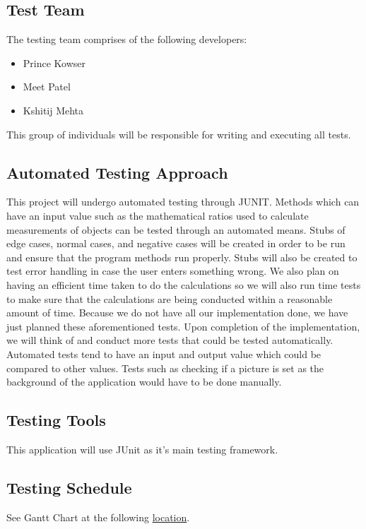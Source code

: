 \documentclass[12pt, titlepage]{article}
\begin{document}
\subsection{Test Team}
The testing team comprises of the following developers:
\begin{itemize}
    \item Prince Kowser
    \item Meet Patel
    \item Kshitij Mehta
\end{itemize}

This group of individuals will be responsible for writing and executing all tests.

\subsection{Automated Testing Approach}

This project will undergo automated testing through JUNIT. Methods which can have an input value such as the mathematical ratios used to calculate measurements of objects can be tested through an automated means. Stubs of edge cases, normal cases, and negative cases will be created in order to be run and ensure that the program methods run properly. Stubs will also be created to test error handling in case the user enters something wrong. We also plan on having an efficient time taken to do the calculations so we will also run time tests to make sure that the calculations are being conducted within a reasonable amount of time. Because we do not have all our implementation done, we have just planned these aforementioned tests. Upon completion of the implementation, we will think of and conduct more tests that could be tested automatically. Automated tests tend to have an input and output value which could be compared to other values. Tests such as checking if a picture is set as the background of the application would have to be done manually.

\subsection{Testing Tools}
This application will use JUnit as it's main testing framework.
\subsection{Testing Schedule}
		
See Gantt Chart at the following  \href{https://gitlab.cas.mcmaster.ca/kowserm/3xa3/tree/master/ProjectSchedule}{location}.
\end{document}
